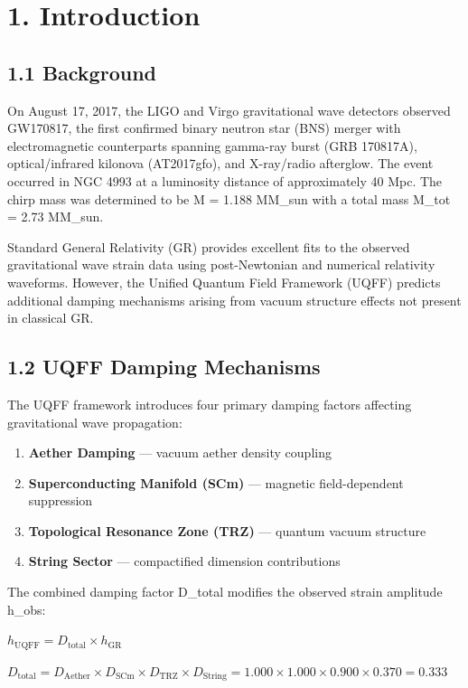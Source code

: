 \documentclass[11pt]{article}
\begin{document}
\section*{1. Introduction}

\subsection*{1.1 Background}

On August 17, 2017, the LIGO and Virgo gravitational wave detectors observed GW170817, the first confirmed binary neutron star (BNS) merger with electromagnetic counterparts spanning gamma-ray burst (GRB 170817A), optical/infrared kilonova (AT2017gfo), and X-ray/radio afterglow. The event occurred in NGC 4993 at a luminosity distance of approximately 40 Mpc. The chirp mass was determined to be M = 1.188 MM\_sun with a total mass M\_tot = 2.73 MM\_sun.

Standard General Relativity (GR) provides excellent fits to the observed gravitational wave strain data using post-Newtonian and numerical relativity waveforms. However, the Unified Quantum Field Framework (UQFF) predicts additional damping mechanisms arising from vacuum structure effects not present in classical GR.

\subsection*{1.2 UQFF Damping Mechanisms}

The UQFF framework introduces four primary damping factors affecting gravitational wave propagation:

\begin{enumerate}
  \item \textbf{Aether Damping} --- vacuum aether density coupling
  \item \textbf{Superconducting Manifold (SCm)} --- magnetic field-dependent suppression
  \item \textbf{Topological Resonance Zone (TRZ)} --- quantum vacuum structure
  \item \textbf{String Sector} --- compactified dimension contributions
\end{enumerate}

The combined damping factor D\_total modifies the observed strain amplitude h\_obs:

$h_{\text{UQFF}} = D_{\text{total}} \times h_{\text{GR}}$

$D_{\text{total}} = D_{\text{Aether}} \times D_{\text{SCm}} \times D_{\text{TRZ}} \times D_{\text{String}} = 1.000 \times 1.000 \times 0.900 \times 0.370 = 0.333$
\end{document}
